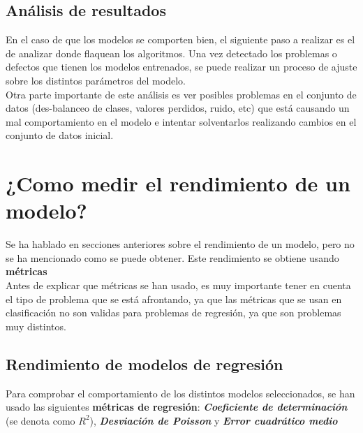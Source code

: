 \subsection{Análisis de resultados}
En el caso de que los modelos se comporten bien, el siguiente paso a realizar es el de analizar donde flaquean los algoritmos. Una vez detectado los problemas o defectos que tienen los modelos entrenados, se puede realizar un proceso de ajuste sobre los distintos parámetros del modelo.\\
\linebreak
Otra parte importante de este análisis es ver posibles problemas en el conjunto de datos (des-balanceo de clases, valores perdidos, ruido, etc) que está causando un mal comportamiento en el modelo e intentar solventarlos realizando cambios en el conjunto de datos inicial.
\pagebreak
\section{¿Como medir el rendimiento de un modelo?}
Se ha hablado en secciones anteriores sobre el rendimiento de un modelo, pero no se ha mencionado como se puede obtener. Este rendimiento se obtiene usando \textbf{métricas}\\
\linebreak
Antes de explicar que métricas se han usado, es muy importante tener en cuenta el tipo de problema que se está afrontando, ya que las métricas que se usan en clasificación no son validas para problemas de regresión, ya que son problemas muy distintos.
\subsection{Rendimiento de modelos de regresión}
Para comprobar el comportamiento de los distintos modelos seleccionados, se han usado las siguientes \textbf{métricas de regresión}: \textit{\textbf{Coeficiente de determinación}} (se denota como $R^2$), \textit{\textbf{Desviación de Poisson}} y \textit{\textbf{Error cuadrático medio}}
